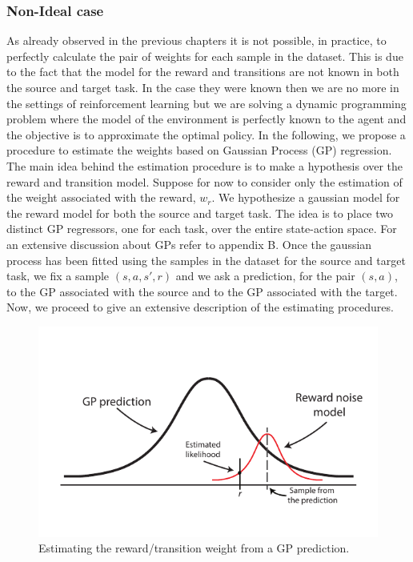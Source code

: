  \subsubsection{Non-Ideal case}
    \noindent As already observed in the previous chapters it is not possible, in practice, to perfectly calculate
    the pair of weights for each sample in the dataset. This is due to the fact that the model for the reward and
    transitions are not known in both the source and target task. In the case they were known then we are no more
    in the settings of reinforcement learning but we are solving a dynamic programming problem where the model
    of the environment is perfectly known to the agent and the objective is to approximate the optimal policy.
    In the following, we propose a procedure to estimate the weights based on Gaussian Process (GP) regression.\newline
    The main idea behind the estimation procedure is to make a hypothesis over the reward and
    transition model. Suppose for now to consider only the estimation of the weight associated with the reward, $w_r$.
    We hypothesize a gaussian model for the reward model for both the source and target task. The idea is to place two distinct GP regressors, one for each task,
    over the entire state-action space. For an extensive discussion about GPs refer to appendix B.\newline
    Once the gaussian process has been fitted using the samples in the dataset for the source and target task, we fix
    a sample $(s,a,s',r)$ and we ask a prediction, for the pair $(s,a)$, to the GP associated with the source and to
    the GP associated with the target.\newline
    Now, we proceed to give an extensive description of the estimating procedures.

    \begin{figure}
      \centering
      \includegraphics[scale=1.1]{images/gaussian.pdf}
      \caption{Estimating the reward/transition weight from a GP prediction.}
      \label{gaussians}
    \end{figure}

